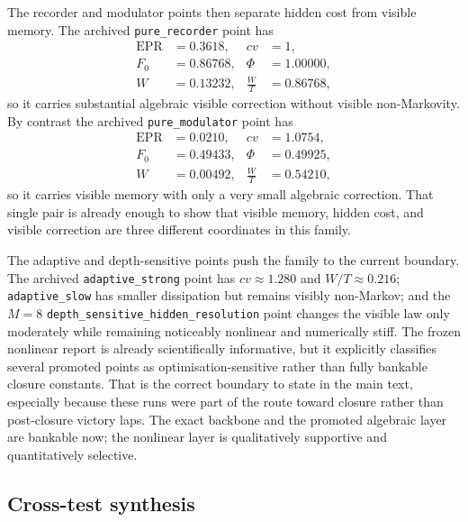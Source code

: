 \documentclass[11pt]{article}
\numberwithin{equation}{section}
\theoremstyle{thmcompact}
\theoremstyle{remark}
\begin{document}
The recorder and modulator points then separate hidden cost from visible memory. The archived \texttt{pure\_recorder} point has
\[
\begin{aligned}
\mathrm{EPR} &= 0.3618, & cv &= 1,\\
F_0 &= 0.86768, & \Phi &= 1.00000,\\
W &= 0.13232, & \frac{W}{T} &= 0.86768,
\end{aligned}
\]
so it carries substantial algebraic visible correction without visible non-Markovity. By contrast the archived \texttt{pure\_modulator} point has
\[
\begin{aligned}
\mathrm{EPR} &= 0.0210, & cv &= 1.0754,\\
F_0 &= 0.49433, & \Phi &= 0.49925,\\
W &= 0.00492, & \frac{W}{T} &= 0.54210,
\end{aligned}
\]
so it carries visible memory with only a very small algebraic correction. That single pair is already enough to show that visible memory, hidden cost, and visible correction are three different coordinates in this family.

The adaptive and depth-sensitive points push the family to the current boundary. The archived \texttt{adaptive\_strong} point has $cv\approx 1.280$ and $W/T\approx 0.216$; \texttt{adaptive\_slow} has smaller dissipation but remains visibly non-Markov; and the $M=8$ \texttt{depth\_sensitive\_hidden\_resolution} point changes the visible law only moderately while remaining noticeably nonlinear and numerically stiff. The frozen nonlinear report is already scientifically informative, but it explicitly classifies several promoted points as optimisation-sensitive rather than fully bankable closure constants. That is the correct boundary to state in the main text, especially because these runs were part of the route toward closure rather than post-closure victory laps. The exact backbone and the promoted algebraic layer are bankable now; the nonlinear layer is qualitatively supportive and quantitatively selective.


\subsection{Cross-test synthesis}
\end{document}
